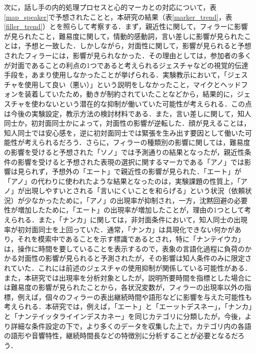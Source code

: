 \documentclass[japanese]{jnlp_1.3a}
\begin{document}
次に，話し手の内的処理プロセスと心的マーカとの対応について，表\ref{map_speaker}で予想されたことと，本研究の結果（表\ref{marker_trend}，表\ref{filler_trend}）とを照らして考察する．まず，親近性に関して，フィラーに影響が見られたこと，難易度に関して，情動的感動詞，言い差しに影響が見られたことは，予想と一致した．しかしながら，対面性に関して，影響が見られると予想されたフィラーには，影響が見られなかった．その理由としては，参加者の多くが対面であることの利点の1つであると考えられるジェスチャなどの視覚的伝達手段を，あまり使用しなかったことが挙げられる．実験教示において，「ジェスチャを使用して良い（悪い）」という説明をしなかったこと，マイクとヘッドフォンを装着していたため，動きが制約されていたことなどから，結果的に，ジェスチャを使わないという潜在的な抑制が働いていた可能性が考えられる．この点は今後の実験設定，教示方法の検討材料である．また，言い差しに関して，知人同士か，初対面同士かによって，対面性の影響が逆転した．顔が見えることは，知人同士では安心感を，逆に初対面同士では緊張を生み出す要因として働いた可能性が考えられるだろう．さらに，フィラーの種類別の影響に関しては，難易度の影響を受けると予想された「ソノ」では予測通りの結果となったが，親近性条件の影響を受けると予想された表現の選択に関するマーカである「アノ」では影響は見られず，予想外の「エート」で親近性の影響が見られた．「エート」が「アノ」の代わりに使われたような結果となったのは，実験課題の性質上，「アノ」が出現しやすいとされる「言いにくいことを和らげる」という状況（依頼状況）が少なかったために，「アノ」の出現率が抑制され，一方，沈黙回避の必要性が増加したために，「エート」の出現率が増加したことが，理由の1つとして考えられる．また，「ナンカ」に関しては，非対面条件において，知人同士の出現率が初対面同士を上回っていた．通常，「ナンカ」は具現化できない何かがあり，それを模索中であることを示す標識であるとされ，特に「ナンテイウカ」は，操作に時間を要していることを表示するので，表象の言語化過程に負荷のかかる対面性の影響が見られると予測されたが，その影響は知人条件のみに限定されていた．これには前述のジェスチャの使用抑制が関係している可能性がある．また，本研究では出現率を分析対象としたが，説明所要時間を指標とした場合には難易度の影響が見られたことから，各状況変数が，フィラーの出現率以外の指標，例えば，個々のフィラーの表出継続時間や語形などに影響を与えた可能性も考えられる．本研究では，例えば，「エート」と「エーットデスネー」，「ナンカ」と「ナンテイッタライインデスカネー」を同じカテゴリに分類したが，今後，より詳細な条件設定の下で，より多くのデータを収集した上で，カテゴリ内の各語の語形や音響特性，継続時間長などの特徴別に分析することが必要となるだろう．
\end{document}
